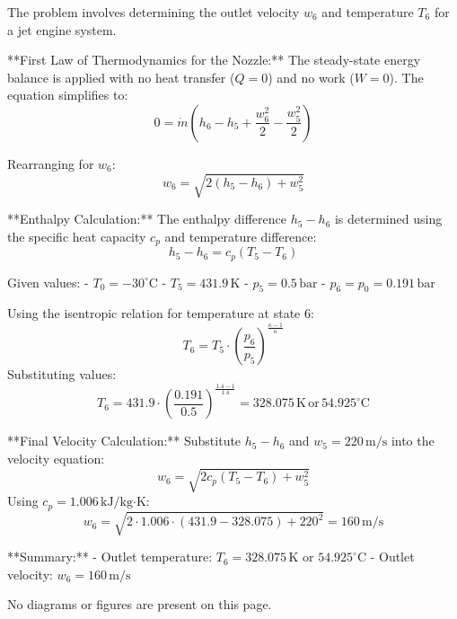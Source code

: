 The problem involves determining the outlet velocity \( w_6 \) and temperature \( T_6 \) for a jet engine system.  

**First Law of Thermodynamics for the Nozzle:**  
The steady-state energy balance is applied with no heat transfer (\( Q = 0 \)) and no work (\( W = 0 \)). The equation simplifies to:  
\[
0 = \dot{m} \left( h_6 - h_5 + \frac{w_6^2}{2} - \frac{w_5^2}{2} \right)
\]  

Rearranging for \( w_6 \):  
\[
w_6 = \sqrt{2 \left( h_5 - h_6 \right) + w_5^2}
\]  

**Enthalpy Calculation:**  
The enthalpy difference \( h_5 - h_6 \) is determined using the specific heat capacity \( c_p \) and temperature difference:  
\[
h_5 - h_6 = c_p \left( T_5 - T_6 \right)
\]  

Given values:  
- \( T_0 = -30^\circ\text{C} \)  
- \( T_5 = 431.9 \, \text{K} \)  
- \( p_5 = 0.5 \, \text{bar} \)  
- \( p_6 = p_0 = 0.191 \, \text{bar} \)  

Using the isentropic relation for temperature at state 6:  
\[
T_6 = T_5 \cdot \left( \frac{p_6}{p_5} \right)^{\frac{\kappa - 1}{\kappa}}
\]  
Substituting values:  
\[
T_6 = 431.9 \cdot \left( \frac{0.191}{0.5} \right)^{\frac{1.4 - 1}{1.4}} = 328.075 \, \text{K} \, \text{or} \, 54.925^\circ\text{C}
\]  

**Final Velocity Calculation:**  
Substitute \( h_5 - h_6 \) and \( w_5 = 220 \, \text{m/s} \) into the velocity equation:  
\[
w_6 = \sqrt{2 c_p \left( T_5 - T_6 \right) + w_5^2}
\]  
Using \( c_p = 1.006 \, \text{kJ/kg·K} \):  
\[
w_6 = \sqrt{2 \cdot 1.006 \cdot (431.9 - 328.075) + 220^2} = 160 \, \text{m/s}
\]  

**Summary:**  
- Outlet temperature: \( T_6 = 328.075 \, \text{K} \) or \( 54.925^\circ\text{C} \)  
- Outlet velocity: \( w_6 = 160 \, \text{m/s} \)  

No diagrams or figures are present on this page.